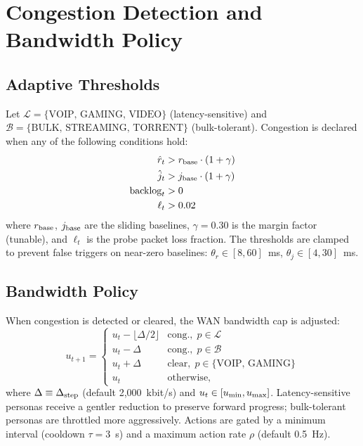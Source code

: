 \section{Congestion Detection and Bandwidth Policy}

\subsection{Adaptive Thresholds}

Let $\mathcal{L}=\{\text{VOIP, GAMING, VIDEO}\}$ (latency-sensitive) and $\mathcal{B}=\{\text{BULK, STREAMING, TORRENT}\}$ (bulk-tolerant). Congestion is declared when any of the following conditions hold:
\begin{align}
  \hat{r}_t &> r_{\rm base}\cdot(1+\gamma) \label{eq:rtt_cong}\\
  \hat{j}_t &> j_{\rm base}\cdot(1+\gamma) \label{eq:jit_cong}\\
  \text{backlog}_t &> 0 \label{eq:bl_cong}\\
  \ell_t &> 0.02 \label{eq:loss_cong}
\end{align}
where $r_{\rm base}$, $j_{\rm base}$ are the sliding baselines, $\gamma=0.30$ is the margin factor (tunable), and $\ell_t$ is the probe packet loss fraction. The thresholds are clamped to prevent false triggers on near-zero baselines: $\theta_r \in [8, 60]$~ms, $\theta_j \in [4, 30]$~ms.

\subsection{Bandwidth Policy}

When congestion is detected or cleared, the WAN bandwidth cap is adjusted:
\begin{equation}
  u_{t+1} =
  \begin{cases}
    u_t - \lfloor\Delta/2\rfloor & \text{cong.},\; p \in \mathcal{L} \\
    u_t - \Delta                 & \text{cong.},\; p \in \mathcal{B} \\
    u_t + \Delta                 & \text{clear},\; p \in \{\text{VOIP, GAMING}\} \\
    u_t                          & \text{otherwise,}
  \end{cases}
  \label{eq:policy}
\end{equation}
where $\Delta \equiv \Delta_{\rm step}$ (default 2,000~kbit/s) and $u_t \in [u_{\rm min}, u_{\rm max}]$. Latency-sensitive personas receive a gentler reduction to preserve forward progress; bulk-tolerant personas are throttled more aggressively. Actions are gated by a minimum interval (cooldown $\tau = 3$~s) and a maximum action rate $\rho$ (default 0.5~Hz).

